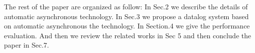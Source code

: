 
The rest of the paper are organized as follow: In Sec.2 we describe the details of  automatic asynchronous technology. In Sec.3 we propose a datalog system based on automatic asynchronous the technology. In Section.4  we give the performance evaluation. And then we review the related works in Sec 5 and then conclude the paper in Sec.7.


